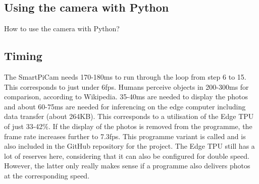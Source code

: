 %
%
%




\subsection{Using the camera with Python}

How to use the camera with Python?

\subsection{Timing}

The SmartPiCam needs 170-180ms to run through the loop from step 6 to 15. This corresponds to just under 6\ac{fps}. Humans perceive objects in 200-300ms for comparison, according to Wikipedia. 35-40ms are needed to display the photos and about 60-75ms are needed for inferencing on the edge computer including data transfer (about 264KB). This corresponds to a utilisation of the Edge TPU of just 33-42\%. If the display of the photos is removed from the programme, the frame rate increases further to 7.3fps. This programme variant is called  and is also included in the GitHub repository for the project. The Edge TPU still has a lot of reserves here, considering that it can also be configured for double speed. However, the latter only really makes sense if a programme also delivers photos at the corresponding speed.
